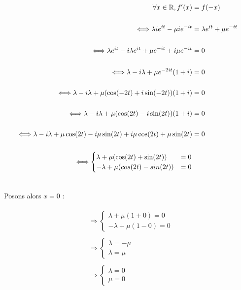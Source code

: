 \documentclass{article}
\begin{document}
\begin{align*}\begin{split}
\forall x\in\mathbb{R}, f'(x)&=f(-x)\\\\
\Longleftrightarrow \lambda i e^{it}-\mu ie^{-it} &= \lambda e^{it}+\mu e^{-it}\\\\
\Longleftrightarrow \lambda e^{it} - i\lambda e^{it} +\mu e^{-it} + i\mu e^{-it}&=0\\\\
\Longleftrightarrow \lambda - i\lambda +\mu e^{-2it}(1+i)&=0\\\\
\Longleftrightarrow \lambda-i\lambda +\mu(\cos(-2t)+i\sin(-2t))(1+i)&=0\\\\
\Longleftrightarrow \lambda-i\lambda +\mu(\cos(2t)-i\sin(2t))(1+i)&=0\\\\
\Longleftrightarrow \lambda-i\lambda +\mu\cos(2t)-i\mu\sin(2t)+i\mu\cos(2t)+\mu\sin(2t)&=0\\\\
\Longleftrightarrow \begin{cases}
\lambda+\mu(\cos(2t)+\sin(2t))&=0\\
-\lambda+\mu(cos(2t)-sin(2t))&=0
\end{cases}\\\\
\end{split}\end{align*}

Posons alors $x=0$ :

\begin{align*}\begin{split}
&\Longrightarrow \begin{cases}
    \lambda + \mu(1+0)=0\\
    -\lambda + \mu(1-0)=0
\end{cases}\\\\
&\Longrightarrow \begin{cases}
    \lambda = -\mu\\
    \lambda = \mu
\end{cases}\\\\
&\Longrightarrow \begin{cases}
    \lambda = 0\\
    \mu = 0
\end{cases}
\end{split}\end{align*}
\end{document}
